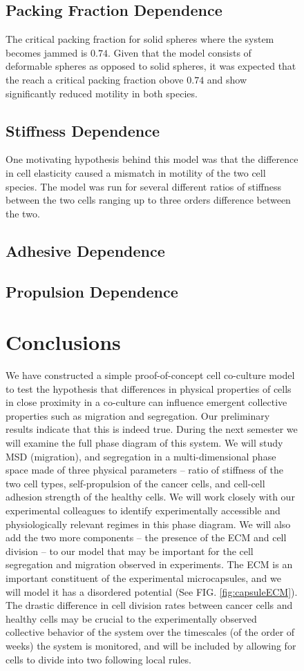 \documentclass[aps,prb,twocolumn,groupedaddress,nofootinbib,floatfix]{revtex4}
\begin{document}
\begin{figure}
\subsection{Packing Fraction Dependence}

The critical packing fraction for solid spheres where the system becomes jammed is $0.74$.
Given that the model consists of deformable spheres as opposed to solid spheres, it was expected that the reach a critical packing fraction obove $0.74$ and show significantly reduced motility in both species.


\subsection{Stiffness Dependence}

One motivating hypothesis behind this model was that the difference in cell elasticity caused a mismatch in motility of the two cell species.
The model was run for several different ratios of stiffness between the two cells ranging up to three orders difference between the two.

\subsection{Adhesive Dependence}

\subsection{Propulsion Dependence}



\section*{Conclusions}
We have constructed a simple proof-of-concept cell co-culture model to test the hypothesis that differences in physical properties of cells in close proximity in a co-culture can influence emergent collective properties such as migration
and segregation. Our preliminary results indicate that this is indeed true.
During the next semester we will examine the full phase diagram of this system.
We will study MSD (migration), and segregation in a multi-dimensional phase space made of three physical parameters -- ratio of stiffness of the two cell types, self-propulsion of the cancer cells, and cell-cell adhesion strength of the healthy cells.
We will work closely with our experimental colleagues to identify experimentally accessible and physiologically relevant regimes in this phase diagram.
We will also add the two more components -- the presence of the ECM and cell division -- to our model that may be important for the cell segregation and migration observed in experiments.
The ECM is an important constituent of the experimental microcapsules, and we will model it has a disordered potential  (See FIG. \ref{fig:capsuleECM}).
The drastic difference in cell division rates between cancer cells and healthy cells may be crucial to the experimentally observed collective behavior of the system over the timescales (of the order of weeks) the system is monitored, and will be included by allowing for cells to divide into two following local rules. 


\end{figure}
\end{document}
